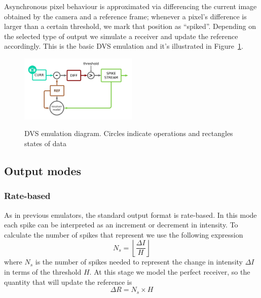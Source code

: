 \documentclass[twocolumn]{article}
\begin{document}
  Asynchronous pixel behaviour is approximated via differencing the current image obtained by the camera and a reference frame; whenever a pixel's difference is larger than a certain threshold, we mark that position as ``spiked''. Depending on the selected type of output we simulate a receiver and update the reference accordingly. This is the basic DVS emulation and it's illustrated in Figure~\ref{fig:dvs_emu}.
  
  \begin{figure}[htb]
    \includegraphics[width=0.5\textwidth]{dvs_emu}
    \label{fig:dvs_emu}
    \caption{DVS emulation diagram. Circles indicate operations and rectangles states of data}
  \end{figure}
  
  \subsection{Output modes}
  \subsubsection{Rate-based}
  As in previous emulators\cite{dvs_emu}, the standard output format is rate-based. In this mode each spike can be interpreted as an increment or decrement in intensity. To calculate the number of spikes that represent we use the following expression
  \begin{equation}
    \label{eq:num_spikes_rate}
    N_{s} = \left\lfloor \frac{\Delta I}{H} \right\rfloor
  \end{equation}
  where $N_{s}$ is the number of spikes needed to represent the change in intensity $\Delta I$ in terms of the threshold $H$. At this stage we model the perfect receiver, so the quantity that will update the reference is
  \begin{equation}
    \label{eq:ref_update}
    \Delta R = N_{s}\times H
  \end{equation}
  
\end{document}

